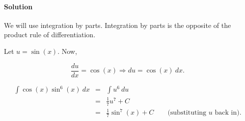 
\paragraph{Solution}

We will use integration by parts. Integration by parts is the opposite of the product rule of differentiation.

Let $u=\sin\left(x\right)$. Now,

\[\frac{du}{dx}=\cos\left(x\right)\Rightarrow du=\cos\left(x\right)~dx.\]

\begin{eqnarray*}
	\int\cos\left(x\right)\sin^6\left(x\right)~dx&=&\int u^6~du\\
	&=&\frac{1}{7}u^7+C\\
	&=&\frac{1}{7}\sin^7\left(x\right)+C\qquad\mbox{(substituting }u\mbox{ back in)}.
\end{eqnarray*}
